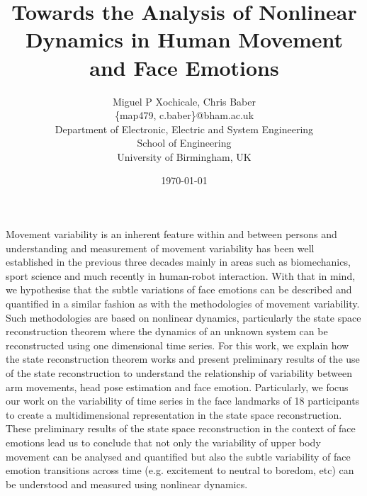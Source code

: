 \documentclass[12pt]{article}
\author{Miguel P Xochicale, Chris Baber \\
\{map479, c.baber\}@bham.ac.uk \\
Department of Electronic, Electric and System Engineering\\
School of Engineering\\
University of Birmingham, UK}
\title{Towards the Analysis of Nonlinear Dynamics in Human Movement and Face Emotions} %
\date{\today}
\begin{document}
\maketitle




Movement variability is an inherent feature within and between persons
and understanding and measurement of movement variability has been well established
in the previous three decades mainly in areas such as biomechanics, sport science
and much recently in human-robot interaction.
With that in mind, we hypothesise that the subtle variations of face emotions
can be described and quantified in a similar fashion as with the methodologies
of movement variability.
Such methodologies are based on nonlinear dynamics, particularly the state space
reconstruction theorem where the dynamics of an unknown system can be reconstructed
using one dimensional time series.
For this work, we explain how the state reconstruction theorem works and
present preliminary results of the use of the state reconstruction
to understand the relationship of variability between arm movements, head pose
estimation and face emotion.
Particularly, we focus our work on the variability of time series in the face landmarks
of 18 participants to create a multidimensional representation in the state space
reconstruction. These preliminary results of the state space reconstruction
in the context of face emotions lead us to conclude that not only
the variability of upper body movement can be analysed and quantified
but also the subtle variability of face emotion transitions
across time (e.g. excitement to neutral to boredom, etc)
can be understood and measured using nonlinear dynamics.
\end{document}
